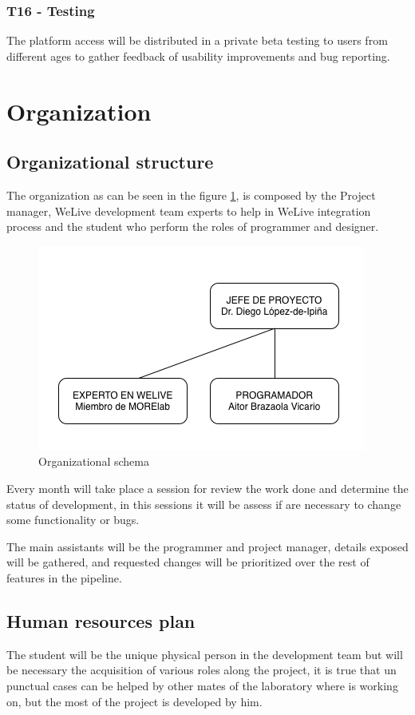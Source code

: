 \documentclass{DeustoFDP}
\begin{document}
\subsubsection{T16 - Testing}
The platform access will be distributed in a private beta testing to users from different ages to gather feedback of usability improvements and bug reporting. 

\section{Organization}
\subsection{Organizational structure}
The organization as can be seen in the figure \ref{fig:esquemaorganizacion}, is composed by the Project manager, WeLive development team experts to help in WeLive integration process and the student who perform the roles of programmer and designer.

\begin{figure}[h]
	\centering
	\includegraphics[width=0.7\linewidth]{fig/esquemaorganizacion}
	\caption[Organizational schema]{Organizational schema}
	\label{fig:esquemaorganizacion}
\end{figure}

Every month will take place a session for review the work done and determine the status of development, in this sessions it will be assess if are necessary to change some functionality or bugs.

The main assistants will be the programmer and project manager, details exposed will be gathered, and requested changes will be prioritized over the rest of features in the pipeline.

\subsection{Human resources plan}
The student will be the unique physical person in the development team but will be necessary the acquisition of various roles along the project, it is true that un punctual cases can be helped by other mates of the laboratory where is working on, but the most of the project is developed by him.
\end{document}
